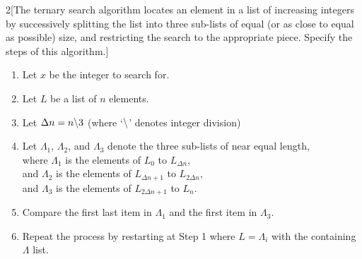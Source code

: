 \documentclass{homework}
\begin{document}
\begin{problem}{2}[The ternary search algorithm locates an element in a list of increasing integers by successively splitting the list into three sub-lists of equal (or as close to equal as possible) size, and restricting the search to the appropriate piece. Specify the steps of this algorithm.]

\begin{enumerate}[(1)]

\item Let $x$ be the integer to search for.

\item Let $L$ be a list of $n$ elements.

\item Let $\Delta n = n \char`\\ 3$ (where `$\char`\\$' denotes integer division)

\item Let $\Lambda_1$, $\Lambda_2$, and $\Lambda_3$ denote the three sub-lists of near equal length, \\
where $\Lambda_1$ is the elements of $L_0$ to $L_{\Delta n}$, \\
and $\Lambda_2$ is the elements of $L_{\Delta n + 1}$ to $L_{2 \Delta n}$, \\
and $\Lambda_3$ is the elements of $L_{2 \Delta n + 1}$ to $L_{n}$. \\

\item Compare the first last item in $\Lambda_1$ and the first item in $\Lambda_3$.

\item Repeat the process by restarting at Step 1 where $L = \Lambda_i$ with the containing $\Lambda$ list.
\end{enumerate}

\end{problem}

\end{document}
